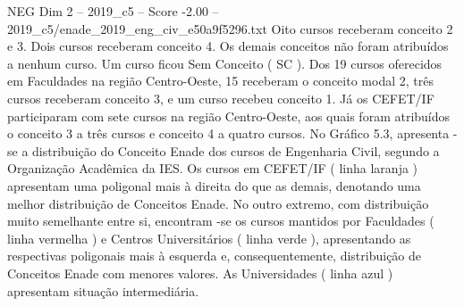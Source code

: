 \begin{textsample}{NEG Dim 2 – 2019\_c5 – Score -2.00 – 2019\_c5/enade\_2019\_eng\_civ\_e50a9f5296.txt}
Oito cursos receberam conceito 2 e 3.
Dois cursos receberam conceito 4.
Os demais conceitos não foram atribuídos a nenhum curso.
Um curso ficou Sem Conceito ( SC ).
Dos 19 cursos oferecidos em Faculdades na região Centro-Oeste, 15 receberam o conceito modal 2, três cursos receberam conceito 3, e um curso recebeu conceito 1.
Já os CEFET/IF participaram com sete cursos na região Centro-Oeste, aos quais foram atribuídos o conceito 3 a três cursos e conceito 4 a quatro cursos.
No Gráfico 5.3, apresenta -se a distribuição do Conceito Enade dos cursos de Engenharia Civil, segundo a Organização Acadêmica da IES.
Os cursos em CEFET/IF ( linha laranja ) apresentam uma poligonal mais à direita do que as demais, denotando uma melhor distribuição de Conceitos Enade.
No outro extremo, com distribuição muito semelhante entre si, encontram -se os cursos mantidos por Faculdades ( linha vermelha ) e Centros Universitários ( linha verde ), apresentando as respectivas poligonais mais à esquerda e, consequentemente, distribuição de Conceitos Enade com menores valores.
As Universidades ( linha azul ) apresentam situação intermediária.

\end{textsample}
